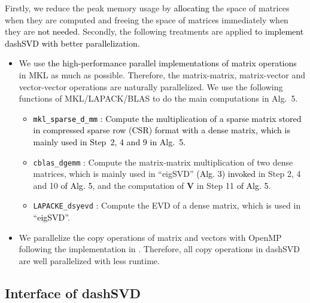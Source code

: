 \documentclass{ol-softwaremanual}
\newcommand{\atn}[1]{\textcolor{black}{#1}}
\newcommand{\atnn}[1]{\textcolor{black}{#1}}
\begin{document}
Firstly, we reduce the peak memory usage by \atnn{allocating} the space of matrices when they are computed
and freeing the space of matrices immediately when they are \atnn{not needed}. Secondly, the following treatments are applied \atn{to implement dashSVD with better parallelization.}
\begin{itemize}
	\item We use \atnn{the high-performance parallel implementations of matrix operations} in MKL as much as possible. Therefore, the matrix-matrix, matrix-vector and vector-vector operations are naturally parallelized. We use the following functions of MKL/LAPACK/BLAS to do the main computations in Alg.~5.%
	\begin{itemize}
		\item \atn{\texttt{mkl\_sparse\_d\_mm} : Compute the multiplication of a sparse matrix stored in \atnn{compressed sparse row (CSR)} format with a dense matrix, which is mainly used in Step~2, 4 and 9 in Alg.~5.}  
		\item \texttt{cblas\_dgemm} : Compute the matrix-matrix multiplication of two dense matrices, which is mainly used in ``eigSVD'' \atnn{(Alg. 3) invoked} in Step 2, 4 and 10 \atnn{of Alg. 5}, and the computation of $\mathbf{V}$ in Step 11 \atnn{of Alg. 5}.
		\item \texttt{LAPACKE\_dsyevd} : Compute the EVD of a dense matrix, which is used in  \atnn{``eigSVD''}.
	\end{itemize}
	\item We parallelize the copy operations of matrix and vectors with OpenMP following the implementation in \cite{martinsson2016randomized2} \cite{randqb-code}. Therefore, all copy operations in dashSVD are well parallelized with less runtime.
\end{itemize}



\subsection{Interface of dashSVD}
\end{document}
